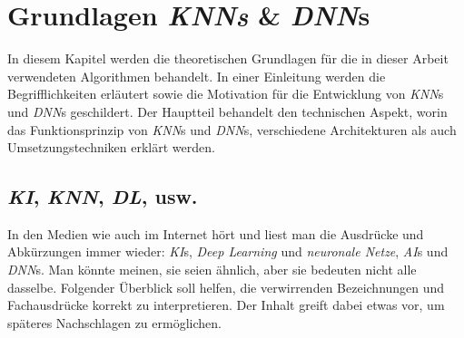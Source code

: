 \section{Grundlagen \textit{KNNs} \& \textit{DNN}s}

In diesem Kapitel werden die theoretischen Grundlagen für die in dieser Arbeit verwendeten Algorithmen behandelt. In einer Einleitung werden die Begrifflichkeiten erläutert sowie die Motivation für die Entwicklung von \textit{KNN}s und \textit{DNN}s geschildert. Der Hauptteil behandelt den technischen Aspekt, worin das Funktionsprinzip von \textit{KNN}s und \textit{DNN}s, verschiedene Architekturen als auch Umsetzungstechniken erklärt werden.

\subsection{\textit{KI}, \textit{KNN}, \textit{DL}, usw.}
In den Medien wie auch im Internet hört und liest man die Ausdrücke und Abkürzungen immer wieder: \textit{KI}s, \textit{Deep Learning} und \textit{neuronale Netze}, \textit{AI}s und \textit{DNN}s. Man könnte meinen, sie seien ähnlich, aber sie bedeuten nicht alle dasselbe. Folgender Überblick soll helfen, die verwirrenden Bezeichnungen und Fachausdrücke korrekt zu interpretieren. Der Inhalt greift dabei etwas vor, um späteres Nachschlagen zu ermöglichen.

